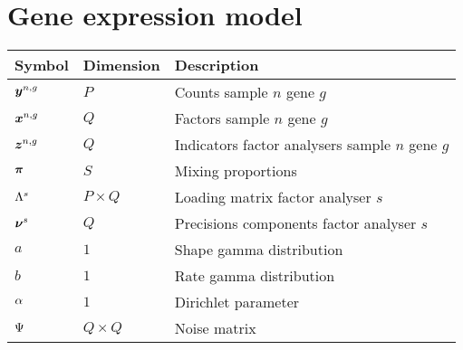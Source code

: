 \documentclass[a4paper]{article}
\begin{document}
\section{Gene expression model}
\begin{table}[h]
  \begin{center}
  \begin{tabular}{lll}
    \toprule
    Symbol & Dimension & Description \\ \hline
    $\boldsymbol{y}^{n,g}$ & $P$ & Counts sample $n$ gene $g$ \\
    $\boldsymbol{x}^{n,g}$ & $Q$ & Factors sample $n$ gene $g$ \\
    $\boldsymbol{z}^{n,g}$ & $Q$ & Indicators factor analysers sample $n$ gene $g$ \\
    $\boldsymbol{\pi}$ & $S$ & Mixing proportions \\
    $\Lambda^s$ & $P \times Q$ & Loading matrix factor analyser $s$ \\
    $\boldsymbol{\nu}^s$ & $Q$ & Precisions components factor analyser $s$ \\ \hline
    $a$ & $1$ & Shape gamma distribution \\
    $b$ & $1$ & Rate gamma distribution \\
    $\alpha$ & $1$ & Dirichlet parameter \\
    $\Psi$ & $Q \times Q$ & Noise matrix \\
    \bottomrule
  \end{tabular}
\end{center}
\end{table}
\end{document}
